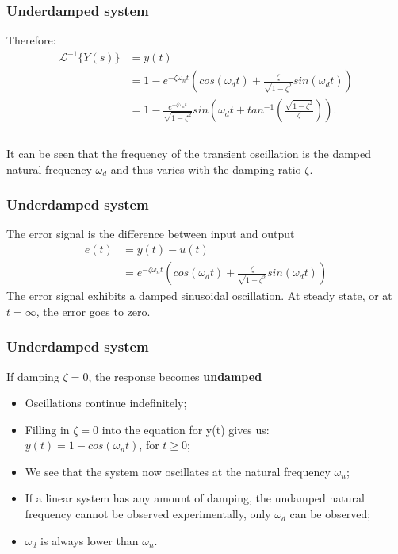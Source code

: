 \begin{frame}
\frametitle{Underdamped system}
Therefore:\\ 
\vspace{-0.5em}
\begin{align*}
\mathcal{L}^{-1}\{Y(s)\} & =y(t)\\
& = 1 - e^{-\zeta\omega_n t}(cos(\omega_d t)+\frac{\zeta}{\sqrt{1 - \zeta^2}}sin(\omega_d t))\\
& = 1 - \frac{e^{-\zeta\omega_n t}}{\sqrt{1-\zeta^2}}sin(\omega_d t+ tan^{-1}(\frac{\sqrt{1-\zeta^2}}{\zeta})).\\
\end{align*}
\\
\vspace{-1em}
It can be seen that the frequency of the transient oscillation is the damped natural frequency $\omega_d$ and thus varies with the damping ratio $\zeta$.
\end{frame}

\begin{frame}
\frametitle{Underdamped system}
The error signal is the difference between input and output
\begin{align*}
e(t)&= y(t) -u(t)\\
&= e^{-\zeta\omega_n t}(cos(\omega_d t)+\frac{\zeta}{\sqrt{1 - \zeta^2}}sin(\omega_d t))
\end{align*}
The error signal exhibits a damped sinusoidal oscillation.
At steady state, or at $t=\infty$, the error goes to zero.
\end{frame}

\begin{frame}
\frametitle{Underdamped system}
If damping $\zeta=0$, the response becomes \textbf{undamped}
\begin{itemize}
\item Oscillations continue indefinitely;
\item Filling in $\zeta=0$ into the equation for y(t) gives us:\\
$y(t) = 1 -cos(\omega_n t)$, for $t\ge 0$;
\item We see that the system now oscillates at the natural frequency $\omega_n$;
\item If a linear system has any amount of damping, the undamped natural frequency cannot be observed experimentally, only $\omega_d$ can be observed;
\item $\omega_d$ is always lower than $\omega_n$.
\end{itemize} 
\end{frame}

